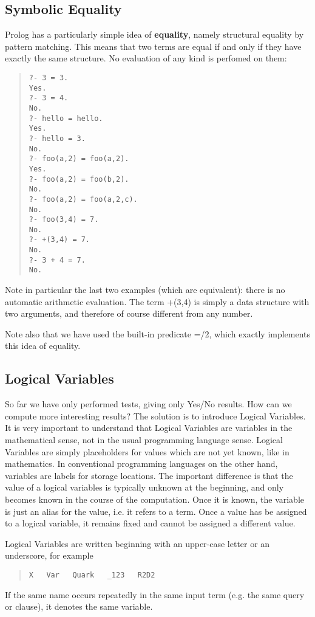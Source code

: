 \subsection{Symbolic Equality}
Prolog has a particularly simple idea of {\bf equality}, namely
structural equality by pattern matching.  This means that two terms
are equal if and only if they have exactly the same structure.  No
evaluation of any kind is perfomed on them:
\begin{quote}\begin{verbatim}
?- 3 = 3.
Yes.
?- 3 = 4.
No.
?- hello = hello.
Yes.
?- hello = 3.
No.
?- foo(a,2) = foo(a,2).
Yes.
?- foo(a,2) = foo(b,2).
No.
?- foo(a,2) = foo(a,2,c).
No.
?- foo(3,4) = 7.
No.
?- +(3,4) = 7.
No.
?- 3 + 4 = 7.
No.
\end{verbatim}\end{quote}
Note in particular the last two examples (which are equivalent):
there is no automatic arithmetic evaluation. The term +(3,4) is simply
a data structure with two arguments, and therefore of course different from
any number.

Note also that we have used the built-in predicate =/2, which exactly
implements this idea of equality.


\subsection{Logical Variables}

 
So far we have only performed tests, giving only Yes/No results.
How can we compute more interesting results? 
The solution is to introduce Logical Variables. 
It is very important to understand that Logical Variables are
variables in the mathematical sense, not in the usual programming
language sense. Logical Variables are simply placeholders for
values which are not yet known, like in mathematics.
In conventional programming languages on the other hand, variables
are labels for storage locations.
The important difference is that the value of a logical variables is
typically unknown at the beginning, and only becomes
known in the course of the computation. Once it is known, the variable is just
an alias for the value, i.e. it refers to a term.
Once a value has be assigned to a logical variable, it remains fixed
and cannot be assigned a different value. 

Logical Variables are written beginning with an upper-case letter or
an underscore, for example
\begin{quote}\begin{verbatim}
X   Var   Quark   _123   R2D2
\end{verbatim}\end{quote}
If the same name occurs repeatedly in the same input term (e.g. the same
query or clause), it denotes the same variable.


